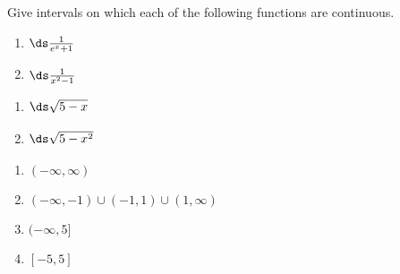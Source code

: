 {Give intervals on which each of the following functions are continuous.\vspace{-5pt}

\noindent\begin{minipage}[t]{.5\linewidth}
\begin{enumerate}
\item		$\ds \frac{1}{e^x+1}$
\item		$\ds \frac{1}{x^2-1}$
\end{enumerate}
\end{minipage}
\begin{minipage}[t]{.5\linewidth}
\begin{enumerate}\addtocounter{enumii}{2}
\item		$\ds \sqrt{5-x}\phantom{\frac{1}{e^x+1}}$
\item		$\ds \sqrt{5-x^2}\phantom{\frac{1}{x^2-1}}$
\end{enumerate}
\end{minipage}
}
{\begin{enumerate}
\item		$(-\infty,\infty)$
\item		$(-\infty,-1)\cup (-1,1) \cup (1,\infty)$
\item		$(-\infty,5]$
\item		$[-5,5]$
\end{enumerate}
}
